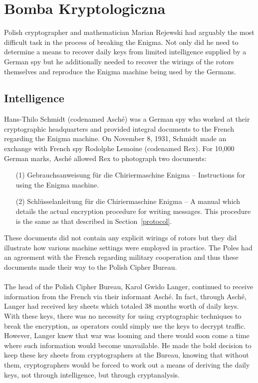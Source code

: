 \chapter{Bomba Kryptologiczna}

Polish cryptographer and mathematician Marian Rejewski had arguably the most difficult task in the process of breaking the Enigma. Not only did he need to determine a means to
recover daily keys from limited intelligence supplied by a German spy but he
additionally needed to recover the wirings of the rotors themselves
and reproduce the Enigma machine being used by the Germans.

\section{Intelligence}

Hans-Thilo Schmidt (codenamed Asché) was a German spy who worked at
their cryptographic headquarters and provided integral documents to
the French regarding the Enigma machine. On November 8, 1931, Schmidt
made an exchange with French spy Rodolphe Lemoine (codenamed Rex).
For 10,000 German marks,  Asché allowed Rex to photograph two documents:
\begin{itemize}
  \item[(1)] Gebrauchsanweisung für die Chiriermaschine
    Enigma -- Instructions for using the Enigma machine.
  \item[(2)] Schlüsselanleitung für die Chiriermaschine Enigma -- A manual
    which details the actual encryption procedure for writing
    messages. This procedure is the same as that described in
    Section~\ref{protocol}.
\end{itemize}
These documents did not contain any explicit wirings of rotors but
they did illustrate how various machine settings were employed in
practice. The Poles had an agreement with the French regarding
military cooperation and thus these documents made their way to the
Polish Cipher Bureau.
\\\\The head of the Polish Cipher Bureau, Karol Gwido Langer,
continued to receive information from the French via their informant
Asché. In fact, through Asché, Langer had received key sheets which
totaled 38 months worth of daily keys. With these keys, there was no
necessity for using cryptographic techniques to break the encryption,
as operators could simply use the keys to decrypt traffic. However,
Langer knew that war was looming and there would soon come a time where
such information would become unavailable. He made the bold decision
to keep these key sheets from cryptographers at the Bureau, knowing
that without them, cryptographers would be forced to work out a means
of deriving the daily keys, not through intelligence, but through cryptanalysis.
